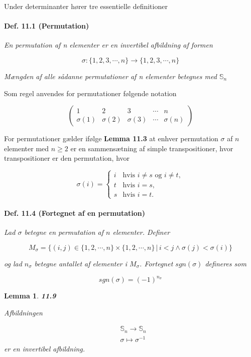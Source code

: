 \documentclass[paper=a4, fontsize=11pt]{scrartcl} %
\newtheorem*{lemma}{Lemma}
\newenvironment{cstmlemma}[1]{\begin{lemma} {\normalfont\textbf{#1}}}{\end{lemma}}
\begin{document}
			
			Under determinanter hører tre essentielle definitioner
			
			\paragraph{Def. 11.1 (Permutation)} \textit{En permutation af n elementer er en invertibel afbildning af formen}
			
			\[\sigma : \{1,2,3,\cdots,n\} \rightarrow \{1,2,3,\cdots,n\}\]
			
			\textit{Mængden af alle sådanne permutationer af n elementer betegnes med $\mathbb{S}_n$}
			
			
			Som regel anvendes for permutationer følgende notation
			
			\[\begin{pmatrix}
			1 & 2 & 3 & \cdots & n\\
			\sigma (1) & \sigma (2) & \sigma (3) & \cdots & \sigma (n)
			\end{pmatrix}\]
			
			For permutationer gælder ifølge \textbf{Lemma 11.3} at enhver permutation $\sigma$ af $n$ elementer med $n \geq 2$ er en sammensætning af simple transpositioner, hvor transpositioner er den permutation, hvor 
			
			\[\sigma (i) = \left \{
			\begin{array}{ll}
			i & \mbox{hvis } i \not = s \mbox{ og } i \not = t,\\
			t & \mbox{hvis } i = s, \\
			s & \mbox{hvis } i = t.
			\end{array}
			\right.\]
			
			\paragraph{Def. 11.4 (Fortegnet af en permutation)} \textit{Lad $\sigma$ betegne en permutation af $n$ elementer. Definer}
			
			\[M_{\sigma} = \{(i,j) \in \{1,2,\cdots,n\} \times \{1,2,\cdots,n\} \,|\, i < j \land \sigma (j) < \sigma (i)\}\]
			
			\textit{og lad $n_{\sigma}$ betegne antallet af elementer i $M_{\sigma}$. Fortegnet $sgn(\sigma)$ defineres som}
			
			\[sgn(\sigma) = (-1)^{n_{\sigma}}\]
			
			\begin{cstmlemma}{11.9} 
				
				Afbildningen
				
				\begin{align*}
				&\mathbb{S}_n \rightarrow \mathbb{S}_n\\
				&\sigma \mapsto \sigma^{-1}
				\end{align*}
				er en invertibel afbildning.
			\end{cstmlemma}
			
\end{document}
